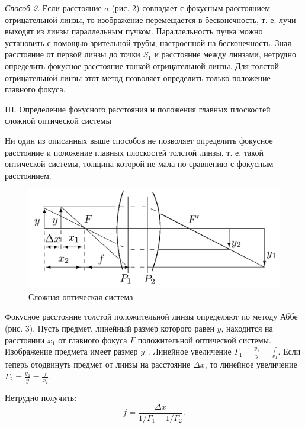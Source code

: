 \documentclass[a4paper,12pt]{article} %
\begin{document}
	\newpage
	\textit{Способ 2}. Если расстояние $a$ (рис. 2) совпадает с фокусным расстоянием отрицательной линзы, то изображение перемещается в бесконечность, т. е. лучи выходят из линзы параллельным пучком. Параллельность пучка можно установить с помощью зрительной трубы, настроенной на бесконечность. Зная расстояние от первой линзы до точки $S_1$ и расстояние между линзами, нетрудно определить фокусное расстояние тонкой отрицательной линзы. Для толстой отрицательной линзы этот метод позволяет определить только положение главного фокуса.
	
	\begin{center}
		III. Определение фокусного расстояния и положения главных плоскостей сложной оптической системы
	\end{center}
	
	Ни один из описанных выше способов не позволяет определить фокусное расстояние и положение главных плоскостей толстой линзы, т. е. такой оптической системы, толщина которой не мала по сравнению с фокусным расстоянием.
	
	\begin{figure}[h!]
		\centering
		\includegraphics[scale=0.6]{Pictures/Сложн}
		\caption{Сложная оптическая система}
	\end{figure}
	
	Фокусное расстояние толстой положительной линзы определяют по методу Аббе (рис. 3). Пусть предмет, линейный размер которого равен $y$, находится на расстоянии $x_1$ от главного фокуса $F$ положительной оптической системы. Изображение предмета имеет размер $y_1$. Линейное увеличение $\Gamma_1 = \frac{y_1}{y} = \frac{f}{x_1}$. Если теперь отодвинуть предмет от линзы на расстояние $\Delta x$, то линейное увеличение $\Gamma_2 = \frac{y_2}{y} = \frac{f}{x_2}$.
	
	Нетрудно получить:
	\begin{equation*}
		f = \frac{\Delta x}{1/\Gamma_1 - 1/\Gamma_2}.
	\end{equation*}
\end{document}
